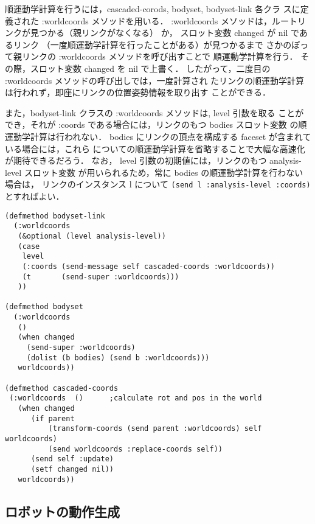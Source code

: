 順運動学計算を行うには，cascaded-corods, bodyset, bodyset-link 各クラ
スに定義された :worldcoords メソッドを用いる．
:worldcoords メソッドは，ルートリンクが見つかる（親リンクがなくなる）
か， スロット変数 changed が nil であるリンク
（一度順運動学計算を行ったことがある）が見つかるまで
さかのぼって親リンクの :worldcoords メソッドを呼び出すことで
順運動学計算を行う．
その際，スロット変数 changed を nil で上書く．
したがって，二度目の :worldcoords メソッドの呼び出しでは，一度計算され
たリンクの順運動学計算は行われず，即座にリンクの位置姿勢情報を取り出す
ことができる．

また，bodyset-link クラスの :worldcoords メソッドは, level 引数を取る
ことができ，それが :coords である場合には，リンクのもつ bodies スロット変数
の順運動学計算は行われない．
bodies にリンクの頂点を構成する faceset が含まれている場合には，これら
についての順運動学計算を省略することで大幅な高速化が期待できるだろう．
なお， level 引数の初期値には，リンクのもつ analysis-level スロット変数
が用いられるため，常に bodies の順運動学計算を行わない場合は，
リンクのインスタンス l について
\verb|(send l :analysis-level :coords)|
とすればよい．

{\baselineskip=10pt
\begin{verbatim}
(defmethod bodyset-link
  (:worldcoords
   (&optional (level analysis-level))
   (case
    level
    (:coords (send-message self cascaded-coords :worldcoords))
    (t       (send-super :worldcoords)))
   ))

(defmethod bodyset
  (:worldcoords
   ()
   (when changed
     (send-super :worldcoords)
     (dolist (b bodies) (send b :worldcoords)))
   worldcoords))

(defmethod cascaded-coords
 (:worldcoords  ()      ;calculate rot and pos in the world
   (when changed
      (if parent
          (transform-coords (send parent :worldcoords) self
worldcoords)
          (send worldcoords :replace-coords self))
      (send self :update)
      (setf changed nil))
   worldcoords))
\end{verbatim}
}

\subsection{ロボットの動作生成}


